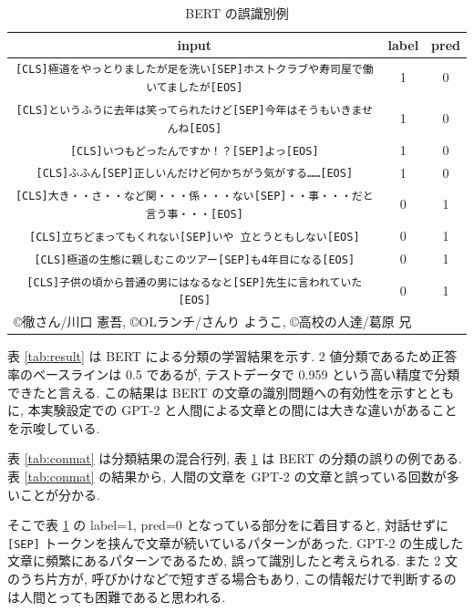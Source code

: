\documentclass[twocolumn]{jarticle}     %
\begin{document}
\begin{table}[tb]
  \begin{center}
    \caption{BERT の誤識別例}
    \begin{tabular}{ccc}
      \hline
      input & label & pred \\
      \hline
      \verb|[CLS]極道をやっとりましたが足を洗い[SEP]ホストクラブや寿司屋で働いてましたが[EOS]| & 1 & 0 \\
      \verb|[CLS]というふうに去年は笑ってられたけど[SEP]今年はそうもいきませんね[EOS]| & 1 & 0 \\
      \verb|[CLS]いつもどったんですか！？[SEP]よっ[EOS]| & 1 & 0 \\
      \verb|[CLS]ふふん[SEP]正しいんだけど何かちがう気がする……[EOS]| & 1 & 0 \\
      \verb|[CLS]大き・・さ・・など関・・・係・・・ない[SEP]・・事・・・だと言う事・・・[EOS]| & 0 & 1 \\
      \verb|[CLS]立ちどまってもくれない[SEP]いや 立とうともしない[EOS]| & 0 & 1 \\
      \verb|[CLS]極道の生態に親しむこのツアー[SEP]も4年目になる[EOS]| & 0 & 1 \\
      \verb|[CLS]子供の頃から普通の男にはなるなと[SEP]先生に言われていた[EOS]| & 0 & 1 \\
      \hline
      \multicolumn{3}{l}{©徹さん/川口 憲吾,   ©OLランチ/さんり ようこ,  ©高校の人達/葛原 兄}
    \end{tabular}
    \label{tab:bert_result}
  \end{center}
\end{table}

表 \ref{tab:result} は BERT による分類の学習結果を示す.
2 値分類であるため正答率のベースラインは 0.5 であるが, テストデータで 0.959 という高い精度で分類できたと言える.
この結果は BERT の文章の識別問題への有効性を示すとともに, 本実験設定での GPT-2 と人間による文章との間には大きな違いがあることを示唆している.



表 \ref{tab:conmat} は分類結果の混合行列,
表 \ref{tab:bert_result} は BERT の分類の誤りの例である.
表 \ref{tab:conmat} の結果から, 人間の文章を GPT-2 の文章と誤っている回数が多いことが分かる.

そこで表 \ref{tab:bert_result} の label=1, pred=0 となっている部分をに着目すると,
対話せずに \verb|[SEP]| トークンを挟んで文章が続いているパターンがあった.
GPT-2 の生成した文章に頻繁にあるパターンであるため, 誤って識別したと考えられる.
また 2 文のうち片方が, 呼びかけなどで短すぎる場合もあり, この情報だけで判断するのは人間とっても困難であると思われる.
\end{document}
